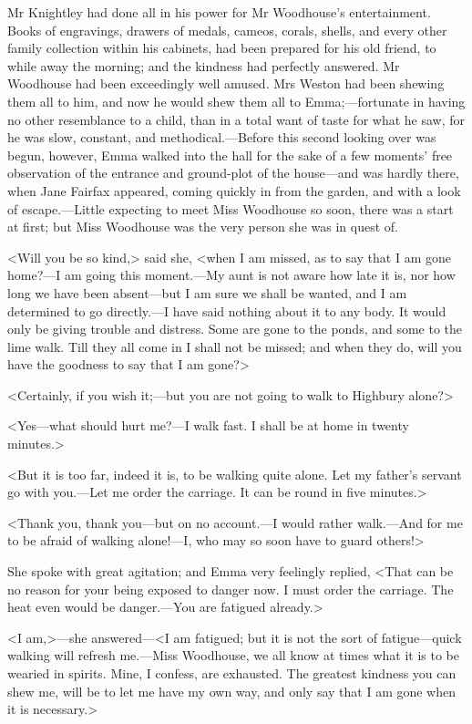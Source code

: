 Mr Knightley had done all in his power for Mr Woodhouse's entertainment. Books of engravings, drawers of medals, cameos, corals, shells, and every other family collection within his cabinets, had been prepared for his old friend, to while away the morning; and the kindness had perfectly answered. Mr Woodhouse had been exceedingly well amused. Mrs Weston had been shewing them all to him, and now he would shew them all to Emma;—fortunate in having no other resemblance to a child, than in a total want of taste for what he saw, for he was slow, constant, and methodical.—Before this second looking over was begun, however, Emma walked into the hall for the sake of a few moments' free observation of the entrance and ground-plot of the house—and was hardly there, when Jane Fairfax appeared, coming quickly in from the garden, and with a look of escape.—Little expecting to meet Miss Woodhouse so soon, there was a start at first; but Miss Woodhouse was the very person she was in quest of.

<Will you be so kind,> said she, <when I am missed, as to say that I am gone home?—I am going this moment.—My aunt is not aware how late it is, nor how long we have been absent—but I am sure we shall be wanted, and I am determined to go directly.—I have said nothing about it to any body. It would only be giving trouble and distress. Some are gone to the ponds, and some to the lime walk. Till they all come in I shall not be missed; and when they do, will you have the goodness to say that I am gone?>

<Certainly, if you wish it;—but you are not going to walk to Highbury alone?>

<Yes—what should hurt me?—I walk fast. I shall be at home in twenty minutes.>

<But it is too far, indeed it is, to be walking quite alone. Let my father's servant go with you.—Let me order the carriage. It can be round in five minutes.>

<Thank you, thank you—but on no account.—I would rather walk.—And for me to be afraid of walking alone!—I, who may so soon have to guard others!>

She spoke with great agitation; and Emma very feelingly replied, <That can be no reason for your being exposed to danger now. I must order the carriage. The heat even would be danger.—You are fatigued already.>

<I am,>—she answered—<I am fatigued; but it is not the sort of fatigue—quick walking will refresh me.—Miss Woodhouse, we all know at times what it is to be wearied in spirits. Mine, I confess, are exhausted. The greatest kindness you can shew me, will be to let me have my own way, and only say that I am gone when it is necessary.>


